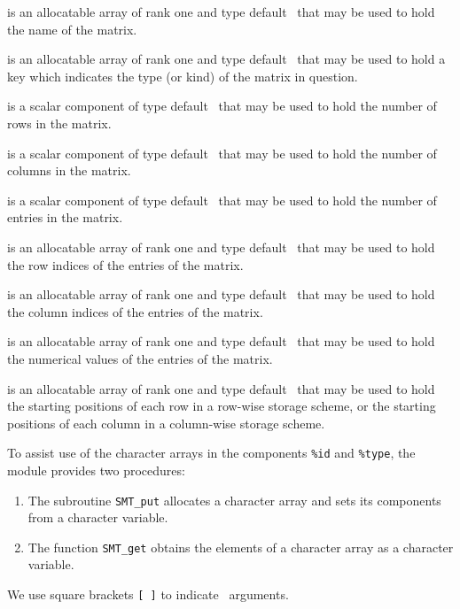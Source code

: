 \documentclass{galahad}
\newcommand{\packagename}{SMT}
\begin{document}
\begin{description}
 is an allocatable array of rank one and type default \character\, that  
may be used to hold the name of the matrix. 
 
 is an allocatable array of rank one and type default \character\, that  
may be used to hold a key which indicates the type (or kind) of the matrix in 
question.  
 
 is a scalar component of type default \integer\, 
that may be used to hold the number of rows in the matrix. 
 
 is a scalar component of type default \integer\, 
that may be used to hold the number of columns in the matrix. 
 
 is a scalar component of type default \integer\, 
that may be used to hold the number of entries in the matrix. 
 
 is an allocatable array of rank one and  
type default \integer\, that may be used to hold 
the row indices of the entries of the matrix. 
 
 is an allocatable array of rank one and  
type default \integer\, that may be used to hold 
the column indices of the entries of the matrix. 
 
 is an allocatable array of rank one and  
type default \realdp\, that may be used to hold 
the numerical values of the entries of the matrix. 
 
 is an allocatable array of rank one and  
type default \integer\, that may be used to hold 
the starting positions of each row in a row-wise storage scheme, 
or the starting positions of each column in a column-wise storage  
scheme. 
\end{description}


\galarguments

To assist use of the character arrays in the components {\tt \%id} and
{\tt \%type}, the module provides two procedures:

\begin{enumerate}
\item The subroutine {\tt \packagename\_put}
allocates a character array and sets
its components from a character variable.

\item The function {\tt \packagename\_get} 
obtains the elements of a character array as a character variable.
\end{enumerate}
We use square brackets {\tt [ ]} to indicate \optional\ arguments.
\end{document}

